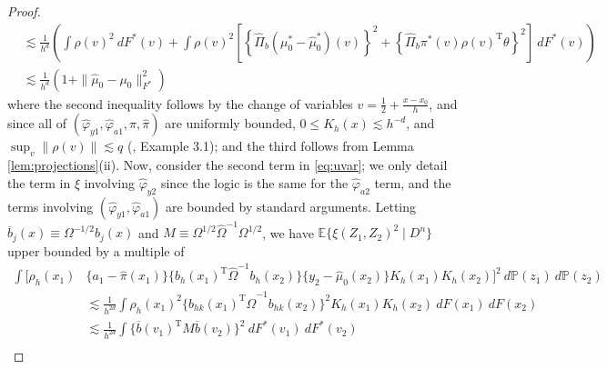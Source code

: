 \documentclass[11pt,twoside]{article}
\def\T{{ \mathrm{\scriptscriptstyle T} }}
\newcommand{\Pb}{\mathbb{P}}
\newcommand{\E}{\mathbb{E}}
\theoremstyle{definition}
\theoremstyle{remark}
\begin{document}
\begin{proof}
\begin{align*}
&\lesssim \frac{1}{h^d} \left( \int \rho(v)^2 \ dF^*(v) + \int \rho(v)^2  \left[ \left\{ \widehat\Pi_{b}(\mu_0^*-\widehat\mu_0^*)(v) \right\}^2 + \left\{ \widehat\Pi_b \pi^*(v) \rho(v)^\T \theta \right\}^2 \right] \ dF^*(v) \right) \\
&\lesssim  \frac{1}{h^d} \left( 1 +  \| \widehat\mu_0 - \mu_0 \|_{F^*}^2  \right) 
\end{align*}
where the second inequality follows by the change of variables $v = \frac{1}{2} + \frac{x-x_0}{h}$, and since all of $(\widehat\varphi_{y1},\widehat\varphi_{a1},\pi,\widehat\pi)$ are uniformly bounded, $0 \leq K_h(x) \lesssim h^{-d}$, and $\sup_v \| \rho(v) \| \lesssim q$ (\citet{belloni2015some}, Example 3.1); and the third follows from Lemma \ref{lem:projections}(ii).  
Now, consider the second term in \eqref{eq:uvar}; we only detail the  term in $\xi$ involving $\widehat\varphi_{y2}$ since the logic is the same for the $\widehat\varphi_{a2}$ term, and the terms involving $(\widehat\varphi_{y1},\widehat\varphi_{a1})$ are bounded by standard arguments. Letting $\overline{b}_j(x) \equiv \Omega^{-1/2} b_j(x)$  and $M \equiv \Omega^{1/2} \widehat\Omega^{-1} \Omega^{1/2} $, we have $\E\{ \xi(Z_1,Z_2)^2 \mid D^n \}$ upper bounded by a multiple of 
\begin{align*}
 \int \bigg[ \rho_h(x_1) &\{a_1 - \widehat\pi(x_1)\} \Big\{ {b}_h(x_1)^\T \widehat\Omega^{-1}   {b}_h(x_2) \Big\} \{y_2 - \widehat\mu_0(x_2)\} K_h(x_1) K_h(x_2) \bigg]^2 \ d\Pb(z_1) \ d\Pb(z_2) \\
&\lesssim \frac{1}{h^{2d}} \int \rho_h(x_1)^2 \Big\{ b_{hk}(x_1)^\T \widehat\Omega^{-1} b_{hk}(x_2) \Big\}^2  K_h(x_1) K_h(x_2) \ dF(x_1) \ dF(x_2) \\
&\lesssim \frac{1}{h^{2d}} \int  \Big\{ \overline{b}(v_1)^\T M \overline{b}(v_2) \Big\}^2 \ dF^*(v_1) \ dF^*(v_2) \\

\end{align*}
\end{proof}
\end{document}
